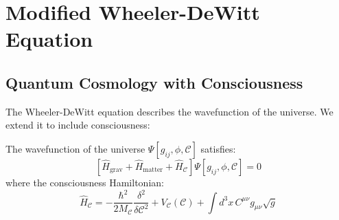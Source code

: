 \section{Modified Wheeler-DeWitt Equation}

\subsection{Quantum Cosmology with Consciousness}

The Wheeler-DeWitt equation\cite{dewitt1967,wheeler1968,kiefer2012} describes the wavefunction of the universe. We extend it to include consciousness:

\begin{thm}\label{thm:wheeler-dewitt}
The wavefunction of the universe $\Psi[g_{ij}, \phi, \mathcal{C}]$ satisfies:
\begin{equation}
\boxed{\left[ \hat{H}_{\text{grav}} + \hat{H}_{\text{matter}} + \hat{H}_\mathcal{C} \right] \Psi[g_{ij}, \phi, \mathcal{C}] = 0}
\end{equation}
where the consciousness Hamiltonian:
\begin{equation}
\hat{H}_\mathcal{C} = -\frac{\hbar^2}{2M_\mathcal{C}} \frac{\delta^2}{\delta \mathcal{C}^2} + V_\mathcal{C}(\mathcal{C}) + \int d^3x \, C^{\mu\nu} g_{\mu\nu} \sqrt{g}
\end{equation}
\end{thm}

